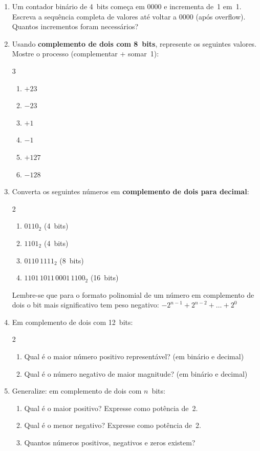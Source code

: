 \documentclass[11pt, a4paper]{article}
\begin{document}
\begin{enumerate}
\item Um contador bin\'{a}rio de 4~bits come\c{c}a em $0000$ e incrementa de~1 em~1. Escreva a sequ\^{e}ncia completa de valores at\'{e} voltar a $0000$ (ap\'{o}s overflow). Quantos incrementos foram necess\'{a}rios?

\item Usando \textbf{complemento de dois com 8~bits}, represente os seguintes valores. Mostre o processo (complementar + somar~1):
\begin{multicols}{3}
\begin{enumerate}
  \item $+23$
  \item $-23$
  \item $+1$
  \item $-1$
  \item $+127$
  \item $-128$
\end{enumerate}
\end{multicols}

\item Converta os seguintes n\'{u}meros em \textbf{complemento de dois para decimal}:
\begin{multicols}{2}
\begin{enumerate}
  \item $0110_2$ \quad (4~bits)
  \item $1101_2$ \quad (4~bits)
  \item $0110\,1111_2$ \quad (8~bits)
  \item $1101\,1011\,0001\,1100_2$ \quad (16~bits)
\end{enumerate}
\end{multicols}
\vspace{-4pt}
\begin{dica}
Lembre-se que para o formato polinomial de um n\'{u}mero em complemento de dois o bit mais significativo tem peso negativo: $-2^{n-1} + 2^{n-2} + \ldots + 2^0$
\end{dica}

\newpage
\item Em complemento de dois com 12~bits:
\begin{multicols}{2}
\begin{enumerate}
  \item Qual \'{e} o maior n\'{u}mero positivo represent\'{a}vel? (em bin\'{a}rio e decimal)
  \item Qual \'{e} o n\'{u}mero negativo de maior magnitude? (em bin\'{a}rio e decimal)
\end{enumerate}
\end{multicols}
\item Generalize: em complemento de dois com $n$~bits:
\begin{enumerate}
  \item Qual \'{e} o maior positivo? Expresse como pot\^{e}ncia de~2.
  \item Qual \'{e} o menor negativo? Expresse como pot\^{e}ncia de~2.
  \item Quantos n\'{u}meros positivos, negativos e zeros existem?
\end{enumerate}


\end{enumerate}
\end{document}

